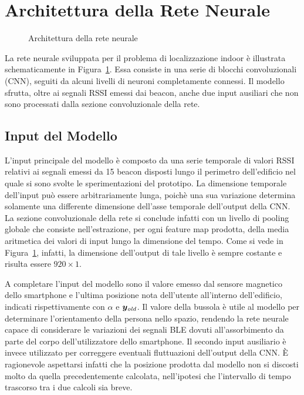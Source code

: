\section{Architettura della Rete Neurale}
\begin{figure}[!htp]
  \caption{Architettura della rete neurale}%
  \label{fig:crynet}%
\end{figure}
La rete neurale sviluppata per il problema di localizzazione indoor è
illustrata schematicamente in Figura~\ref{fig:crynet}. Essa consiste in una
serie di blocchi convoluzionali (CNN), seguiti da alcuni livelli di neuroni
completamente connessi. Il modello sfrutta, oltre ai segnali RSSI emessi dai
beacon, anche due input ausiliari che non sono processati dalla sezione
convoluzionale della rete.
\subsection{Input del Modello}\label{subsec:input}
L'input principale del modello è composto da una serie temporale di valori RSSI
relativi ai segnali emessi da 15 beacon disposti lungo il perimetro
dell'edificio nel quale si sono svolte le sperimentazioni del prototipo. La
dimensione temporale dell'input può essere arbitrariamente lunga, poichè una
sua variazione determina solamente una differente dimensione dell'asse
temporale dell'output della CNN\@. La sezione convoluzionale della rete si
conclude infatti con un livello di pooling globale che consiste
nell'estrazione, per ogni feature map prodotta, della media aritmetica dei
valori di input lungo la dimensione del tempo. Come si vede in
Figura~\ref{fig:crynet}, infatti, la dimensione dell'output di tale livello è
sempre costante e risulta essere $920\times1$.

A completare l'input del modello sono il valore emesso dal sensore magnetico
dello smartphone e l'ultima posizione nota dell'utente all'interno
dell'edificio, indicati rispettivamente con \(\alpha\) e \( \bm y_{\mathit{old}} \). Il
valore della bussola è utile al modello per determinare l'orientamento della
persona nello spazio, rendendo la rete neurale capace di considerare le
variazioni dei segnali BLE dovuti all'assorbimento da parte del corpo
dell'utilizzatore dello smartphone. Il secondo input ausiliario è invece
utilizzato per correggere eventuali fluttuazioni dell'output della CNN.
È ragionevole aspettarsi infatti che la posizione prodotta dal modello non si
discosti molto da quella precedentemente calcolata, nell'ipotesi che
l'intervallo di tempo trascorso tra i due calcoli sia breve.

